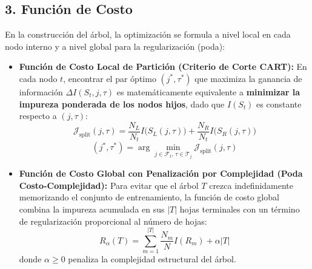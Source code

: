 \documentclass[11pt, a4paper]{article}
\begin{document}
\subsection*{3. Función de Costo}
En la construcción del árbol, la optimización se formula a nivel local en cada nodo interno y a nivel global para la regularización (poda):

\begin{itemize}
    \item \textbf{Función de Costo Local de Partición (Criterio de Corte CART):}
    En cada nodo $t$, encontrar el par óptimo $(j^*, \tau^*)$ que maximiza la ganancia de información $\Delta I(S_t, j, \tau)$ es matemáticamente equivalente a \textbf{minimizar la impureza ponderada de los nodos hijos}, dado que $I(S_t)$ es constante respecto a $(j, \tau)$:
    \begin{equation}
        \mathcal{J}_{\text{split}}(j, \tau) = \frac{N_L}{N_t} I\big(S_L(j, \tau)\big) + \frac{N_R}{N_t} I\big(S_R(j, \tau)\big)
    \end{equation}
    \begin{equation}
        (j^*, \tau^*) = \arg\min_{j \in \mathcal{F}_t, \, \tau \in \mathcal{T}_j} \mathcal{J}_{\text{split}}(j, \tau)
    \end{equation}

    \item \textbf{Función de Costo Global con Penalización por Complejidad (Poda Costo-Complejidad):}
    Para evitar que el árbol $T$ crezca indefinidamente memorizando el conjunto de entrenamiento, la función de costo global combina la impureza acumulada en sus $|T|$ hojas terminales con un término de regularización proporcional al número de hojas:
    \begin{equation}
        R_\alpha(T) = \sum_{m=1}^{|T|} \frac{N_m}{N} I(R_m) + \alpha |T|
    \end{equation}
    donde $\alpha \ge 0$ penaliza la complejidad estructural del árbol.
\end{itemize}
\end{document}
